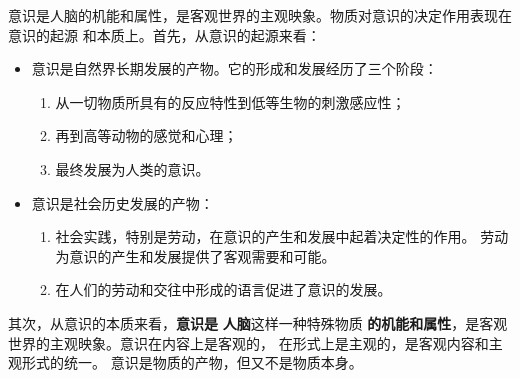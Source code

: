 \documentclass[11pt, UTF8]{book} %
\begin{document}
意识是人脑的机能和属性，是客观世界的主观映象。物质对意识的决定作用表现在意识的起源
和本质上。首先，从意识的起源来看：
\begin{itemize}[itemsep=0pt]
    \item 意识是自然界长期发展的产物。它的形成和发展经历了三个阶段：
    \begin{enumerate}[label={$\left.\arabic*\right)$}, itemsep=0pt]
        \item 从一切物质所具有的反应特性到低等生物的刺激感应性；
        \item 再到高等动物的感觉和心理；
        \item 最终发展为人类的意识。
    \end{enumerate}
    \item 意识是社会历史发展的产物：
    \begin{enumerate}[label={$\left.\arabic*\right)$}, itemsep=0pt]
        \item 社会实践，特别是劳动，在意识的产生和发展中起着决定性的作用。
        劳动为意识的产生和发展提供了客观需要和可能。
        \item 在人们的劳动和交往中形成的语言促进了意识的发展。
    \end{enumerate}
\end{itemize}
其次，从意识的本质来看，\textbf{意识是} \textbf{人脑}这样一种特殊物质
\textbf{的机能和属性}，是客观世界的主观映象。意识在内容上是客观的，
在形式上是主观的，是客观内容和主观形式的统一。
意识是物质的产物，但又不是物质本身。
\end{document}

